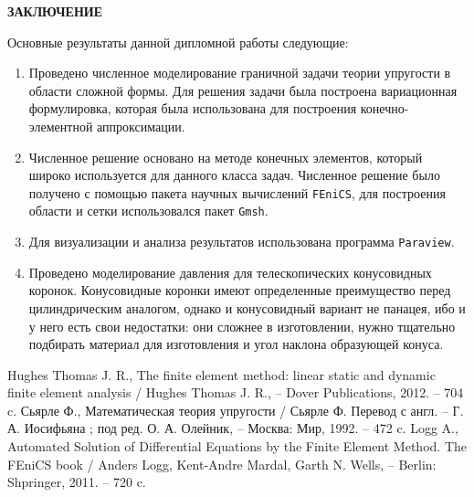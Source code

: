 \documentclass[a4paper, 14pt]{extreport}
\begin{document}
\newpage
{}
\begin{center}
	\Large{\textbf{ЗАКЛЮЧЕНИЕ}}
\end{center}

Основные результаты данной дипломной работы следующие:
\begin{enumerate}
\item Проведено численное моделирование граничной задачи 
теории упругости в области сложной формы. Для решения
задачи была построена вариационная формулировка, которая 
была использована для построения конечно-элементной 
аппроксимации.

\item Численное решение основано на методе конечных 
элементов, который широко используется для данного класса 
задач. Численное решение было получено с помощью 
пакета научных вычислений \texttt{FEniCS}, для построения 
области и сетки использовался пакет \texttt{Gmsh}.

\item Для визуализации и анализа результатов использована 
программа \texttt{Paraview}.

\item Проведено моделирование давления для телескопических 
конусовидных коронок. Конусовидные коронки имеют 
определенные преимущество перед цилиндрическим аналогом,
однако и конусовидный вариант не панацея, ибо и у него есть 
свои недостатки: они сложнее в изготовлении, нужно тщательно  
подбирать материал для изготовления и угол наклона 
образующей конуса.

\end{enumerate}


\newpage
{}
\renewcommand{\bibname}{\Large{СПИСОК ИСПОЛЬЗОВАННЫХ ИСТОЧНИКОВ}}
\begin{thebibliography}{9}

			Hughes Thomas J. R.,
			{The finite element method: linear static and dynamic finite element analysis} /
			Hughes Thomas J. R., -- Dover Publications, 2012. -- 704 c.
			Сьярле Ф.,
			{Математическая теория упругости} /
			Сьярле Ф. Перевод с англ. -- Г. А. Иосифьяна ; под ред. О. А. Олейник, -- Москва: Мир, 1992. -- 472 c.
			Logg A.,
			{Automated Solution of Differential Equations by the Finite Element Method. The FEniCS book} /
			Anders Logg, Kent-Andre Mardal, Garth N. Wells, -- Berlin: Shpringer, 2011. -- 720 c.
\end{thebibliography}
\end{document}
